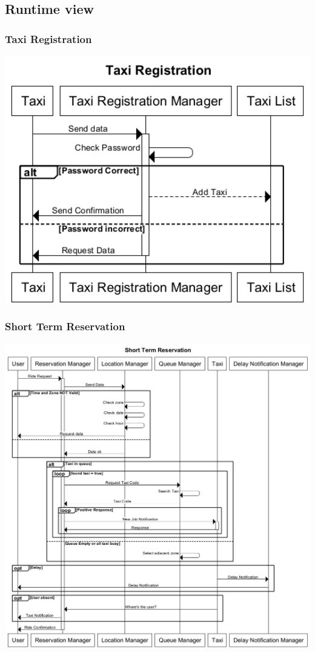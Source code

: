 \subsection{Runtime view}
	\subsubsection{Taxi Registration}
		\begin{center}
			\includegraphics[width=1\textwidth]{./images/Taxi_Registration.png}
		\end{center}
	\subsubsection{Short Term Reservation}
		\begin{center}
			\includegraphics[width=1\textwidth]{./images/Short_Term_Reservation_Complete.png}
		\end{center}
